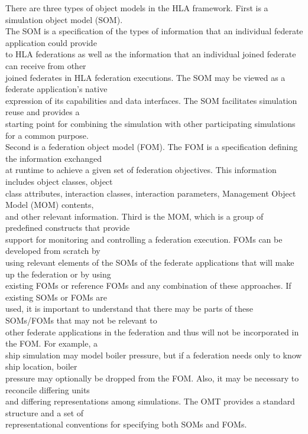 \vspace{0.8pt}
There are three types of object models in the HLA framework. First is a simulation object model (SOM).\\
The SOM is a specification of the types of information that an individual federate application could provide\\
to HLA federations as well as the information that an individual joined federate can receive from other\\
joined federates in HLA federation executions. The SOM may be viewed as a federate application's native\\
expression of its capabilities and data interfaces. The SOM facilitates simulation reuse and provides a\\
starting point for combining the simulation with other participating simulations for a common purpose.\\
Second is a federation object model (FOM). The FOM is a specification defining the information exchanged\\
at runtime to achieve a given set of federation objectives. This information includes object classes, object\\
class attributes, interaction classes, interaction parameters, Management Object Model (MOM) contents,\\
and other relevant information. Third is the MOM, which is a group of predefined constructs that provide\\
support for monitoring and controlling a federation execution. FOMs can be developed from scratch by\\
using relevant elements of the SOMs of the federate applications that will make up the federation or by using\\
existing FOMs or reference FOMs and any combination of these approaches. If existing SOMs or FOMs are\\
used, it is important to understand that there may be parts of these SOMs/FOMs that may not be relevant to\\
other federate applications in the federation and thus will not be incorporated in the FOM. For example, a\\
ship simulation may model boiler pressure, but if a federation needs only to know ship location, boiler\\
pressure may optionally be dropped from the FOM. Also, it may be necessary to reconcile differing units\\
and differing representations among simulations. The OMT provides a standard structure and a set of\\
representational conventions for specifying both SOMs and FOMs.


